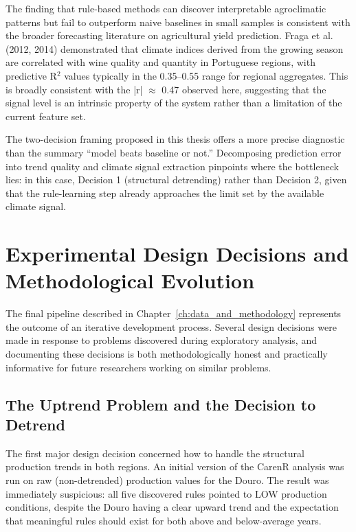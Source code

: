 The finding that rule-based methods can discover interpretable agroclimatic patterns but fail to outperform naive baselines in small samples is consistent with the broader forecasting literature on agricultural yield prediction. Fraga et al. (2012, 2014) demonstrated that climate indices derived from the growing season are correlated with wine quality and quantity in Portuguese regions, with predictive R$^2$ values typically in the 0.35--0.55 range for regional aggregates. This is broadly consistent with the |r| $\approx$ 0.47 observed here, suggesting that the signal level is an intrinsic property of the system rather than a limitation of the current feature set.

The two-decision framing proposed in this thesis offers a more precise diagnostic than the summary “model beats baseline or not.” Decomposing prediction error into trend quality and climate signal extraction pinpoints where the bottleneck lies: in this case, Decision 1 (structural detrending) rather than Decision 2, given that the rule-learning step already approaches the limit set by the available climate signal.




\section{Experimental Design Decisions and Methodological Evolution}\label{sec:experimental_design_decisions_and}

The final pipeline described in Chapter~\ref{ch:data_and_methodology} represents the outcome of an iterative development process. Several design decisions were made in response to problems discovered during exploratory analysis, and documenting these decisions is both methodologically honest and practically informative for future researchers working on similar problems.


\subsection{The Uptrend Problem and the Decision to Detrend}\label{sub:the_uptrend_problem_and}

The first major design decision concerned how to handle the structural production trends in both regions. An initial version of the CarenR analysis was run on raw (non-detrended) production values for the Douro. The result was immediately suspicious: all five discovered rules pointed to LOW production conditions, despite the Douro having a clear upward trend and the expectation that meaningful rules should exist for both above and below-average years.

